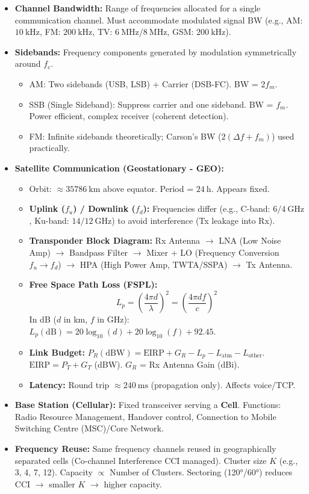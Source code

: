 \documentclass[11pt]{article}
\begin{document}
\begin{propriete}
\begin{itemize}
\item \textbf{Channel Bandwidth:} Range of frequencies allocated for a single communication channel. Must accommodate modulated signal BW (e.g., AM: $10\ \mathrm{kHz}$, FM: $200\ \mathrm{kHz}$, TV: $6\ \mathrm{MHz}$/$8\ \mathrm{MHz}$, GSM: $200\ \mathrm{kHz}$).
\item \textbf{Sidebands:} Frequency components generated by modulation symmetrically around $f_c$.
\begin{itemize}
\item AM: Two sidebands (USB, LSB) + Carrier (DSB-FC). BW = $2f_m$.
\item SSB (Single Sideband): Suppress carrier and one sideband. BW = $f_m$. Power efficient, complex receiver (coherent detection).
\item FM: Infinite sidebands theoretically; Carson's BW ($2(\Delta f+f_m)$) used practically.
\end{itemize}
\item \textbf{Satellite Communication (Geostationary - GEO):}
\begin{itemize}
\item Orbit: $\approx 35786\ \mathrm{km}$ above equator. Period = $24\ \mathrm{h}$. Appears fixed.
\item \textbf{Uplink ($f_u$) / Downlink ($f_d$):} Frequencies differ (e.g., C-band: $6/4\ \mathrm{GHz}$, Ku-band: $14/12\ \mathrm{GHz}$) to avoid interference (Tx leakage into Rx).
\item \textbf{Transponder Block Diagram:} Rx Antenna $\to$ LNA (Low Noise Amp) $\to$ Bandpass Filter $\to$ Mixer + LO (Frequency Conversion $f_u \to f_d$) $\to$ HPA (High Power Amp, TWTA/SSPA) $\to$ Tx Antenna.
\item \textbf{Free Space Path Loss (FSPL):}
\[
L_p = \left( \frac{4\pi d}{\lambda} \right)^2 = \left( \frac{4\pi d f}{c} \right)^2
\]
In dB ($d$ in km, $f$ in GHz): $L_p(\mathrm{dB}) = 20\log_{10}(d) + 20\log_{10}(f) + 92.45$.
\item \textbf{Link Budget:} $P_R (\mathrm{dBW}) = \mathrm{EIRP} + G_R - L_p - L_{\mathrm{atm}} - L_{\mathrm{other}}$.
$\mathrm{EIRP} = P_T + G_T$ (dBW). $G_R$ = Rx Antenna Gain (dBi).
\item \textbf{Latency:} Round trip $\approx 240\ \mathrm{ms}$ (propagation only). Affects voice/TCP.
\end{itemize}
\item \textbf{Base Station (Cellular):} Fixed transceiver serving a \textbf{Cell}. Functions: Radio Resource Management, Handover control, Connection to Mobile Switching Centre (MSC)/Core Network.
\item \textbf{Frequency Reuse:} Same frequency channels reused in geographically separated cells (Co-channel Interference CCI managed). Cluster size $K$ (e.g., 3, 4, 7, 12). Capacity $\propto$ Number of Clusters. Sectoring (120°/60°) reduces CCI $\to$ smaller $K$ $\to$ higher capacity.
\end{itemize}
\end{propriete}
\end{document}
